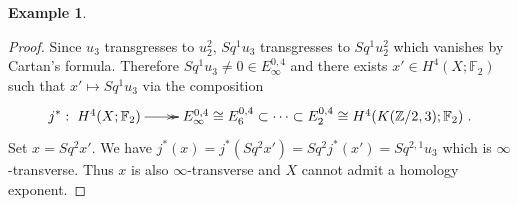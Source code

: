 \documentclass{amsart}
\theoremstyle{definition}
\newtheorem{exmp}[thm]{Example}
\theoremstyle{remark}
\newtheorem{rem}[thm]{Remark}
\newcommand{\Z}{\mathbb{Z}}
\newcommand{\F}{\mathbb{F}}
\begin{document}
\begin{exmp}
\begin{proof}
Since $u_3$ transgresses to $u_2^2$, $Sq^1u_3$ transgresses to $Sq^1u_2^2$ which vanishes by Cartan's formula. Therefore $Sq^1u_3\not=0\in E_\infty^{0,4}$ and there exists $x'\in H^4(X;\F_2)$ such that $x'\mapsto Sq^1u_3$ via the composition
$$
j^*:\xymatrix{H^4(X;\F_2)\ar@{->>}[r] &E^{0,4}_\infty\cong E^{0,4}_6\subset\dots\subset E^{0,4}_2\cong H^4(K(\Z/2,3);\F_2)}.
$$ Set $x=Sq^2x'$. We have $j^*(x)=j^*(Sq^2x')=Sq^2j^*(x')=Sq^{2,1}u_3$ which is $\infty$-transverse. Thus $x$ is also $\infty$-transverse and $X$ cannot admit a homology exponent. 
\end{proof}
\end{exmp}
%


\end{document}
